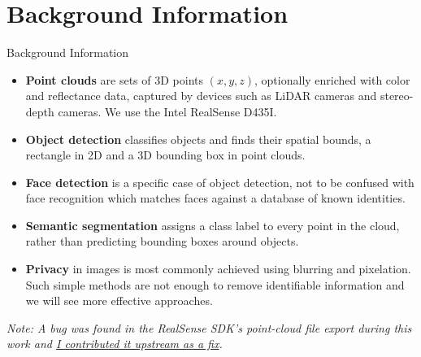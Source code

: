 \documentclass{beamer}
\begin{document}
\section{Background Information}
\begin{frame}{Background Information}
	\begin{itemize}
		\item \textbf{Point clouds} are sets of 3D points $(x, y, z)$, optionally enriched with color and reflectance data, captured by devices such as LiDAR cameras and stereo-depth cameras. We use the Intel RealSense D435I.
		\item \textbf{Object detection} classifies objects and finds their spatial bounds, a rectangle in 2D and a 3D bounding box in point clouds.
		\item \textbf{Face detection} is a specific case of object detection, not to be confused with face recognition which matches faces against a database of known identities.
		\item \textbf{Semantic segmentation} assigns a class label to every point in the cloud, rather than predicting bounding boxes around objects.
		\item \textbf{Privacy} in images is most commonly achieved using blurring and pixelation. Such simple methods are not enough to remove identifiable information \cite{Reid_Samangooei_Chen_Nixon_Ross_2013} and we will see more effective approaches.
	\end{itemize}

	\vfill
	{\small \textit{Note: A bug was found in the RealSense SDK's point-cloud file export during this work and \href{https://github.com/realsenseai/librealsense/pull/14711}{I contributed it upstream as a fix}.}}
\end{frame}
\end{document}
